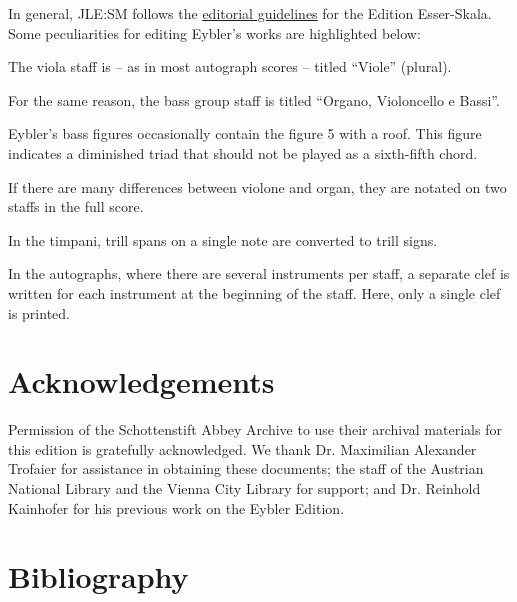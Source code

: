 \documentclass{ees}
\begin{document}
In general, JLE:SM follows the \href{https://edition.esser-skala.at/about/editorial-guidelines/}{editorial guidelines} for the Edition Esser-Skala. Some peculiarities for editing Eybler's works are highlighted below:

\begin{bulletlist}
  \item The viola staff is – as in most autograph scores – titled “Viole” (plural).
  \item For the same reason, the bass group staff is titled “Organo, Violoncello e Bassi”.
  \item Eybler's bass figures occasionally contain the figure 5 with a roof. This figure indicates a diminished triad that should not be played as a sixth-fifth chord.
  \item If there are many differences between violone and organ, they are notated on two staffs in the full score.
  \item In the timpani, trill spans on a single note are converted to trill signs.
  \item In the autographs, where there are several instruments per staff, a separate clef is written for each instrument at the beginning of the staff. Here, only a single clef is printed.
\end{bulletlist}


\section{Acknowledgements}

Permission of the Schottenstift Abbey Archive to use their archival materials for this edition is gratefully acknowledged. We thank Dr. Maximilian Alexander Trofaier for assistance in obtaining these documents; the staff of the Austrian National Library and the Vienna City Library for support; and Dr. Reinhold Kainhofer for his previous work on the Eybler Edition.


\section{Bibliography}
\end{document}
